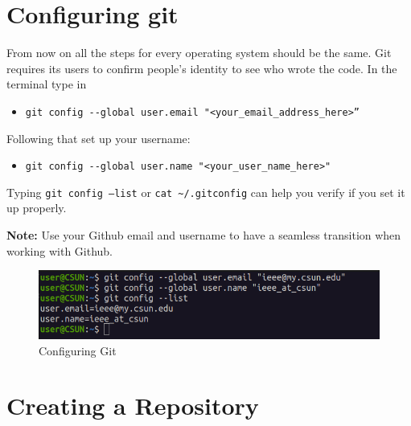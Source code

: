 \documentclass[12pt, a4paper]{article}
\begin{document}
\section{Configuring git}

From now on all the steps for every operating system should be the same.
Git requires its users to confirm people's identity to see who wrote the code. In the terminal type in
\begin{itemize}
\item\verb+git config --global user.email "<your_email_address_here>”+
\end{itemize}
Following that set up your username:
\begin{itemize}
\item \verb+git config --global user.name "<your_user_name_here>"+
\end{itemize}

Typing \texttt{git config --list} or \verb`cat ~/.gitconfig` can help you verify if you set it up properly.\\\par
\textbf{Note:} Use your Github email and username to have a seamless transition when working with Github.

\begin{figure}[H]
\centering
\includegraphics[scale=0.5]{../images/workshop-I/git-config.png}
\caption{Configuring Git}
\end{figure}
\section{Creating a Repository}
\end{document}
